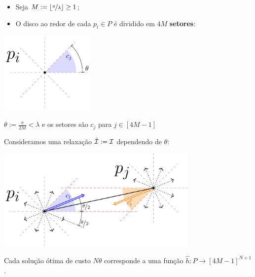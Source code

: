 \begin{frame}{}
    \begin{itemize}[<+->]
        \item Seja $M := \lfloor\nicefrac{\pi}{\lambda}\rfloor \geq 1$;

        \item O disco ao redor de cada $p_i\in P$ é dividido em $4M$ \textbf{setores}:
    \end{itemize}
    
    \bigskip
    \pause
    \begin{minipage}{\linewidth}
        \centering
        \includegraphics[height=4cm]{MSC/angle.png}
    \end{minipage}

    \bigskip
    \centering
    $\theta := \frac{\pi}{2M} < \lambda$ e os setores são $c_j$ para $j \in [4M-1]$
\end{frame}

\begin{frame}{}
    Consideramos uma relaxação ${\hat {\mathcal{I}}:= \mathcal{I}}$ dependendo de $\theta$:
    
    \bigskip
    \pause
    \begin{minipage}{\linewidth}
        \centering
        \includegraphics[height=5cm]{MSC/discrete.png}
    \end{minipage}
\end{frame}

\begin{frame}{}
    \begin{obs}
        Cada solução ótima de custo $N \theta$ corresponde a uma função \mbox{$\hat h\colon P \to [4M-1]^{N+1}$}.
    \end{obs}
\end{frame}

